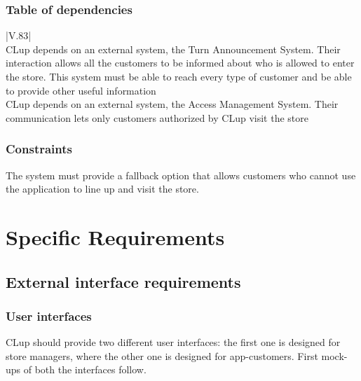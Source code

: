 \documentclass[a4paper,oneside,11pt]{book}   %
\begin{document}
    \subsection{Table of dependencies}
    \begin{longtable}[c] {|V{.83\textwidth}|}
        \hline
         \\
        \hline
        CLup depends on an external system, the Turn Announcement System. Their interaction allows all the customers to be informed about who is allowed to enter the store. This system must be able to reach every type of customer and be able to provide other useful information \\ \hline
        CLup depends on an external system, the Access Management System. Their communication lets only customers authorized by CLup visit the store \\
        \hline
        \caption{Table of dependencies}
        \label{table:dependencies}
    \end{longtable}
    
    \subsection{Constraints} 
    The system must provide a fallback option that allows customers who cannot use the application to line up and visit the store.
    
    
\chapter{Specific Requirements}
    \section{External interface requirements}
    \subsection{User interfaces}
    CLup should provide two different user interfaces: the first one is designed for store managers, where the other one is designed for app-customers. First mock-ups of both the interfaces follow.
    
\end{document}

